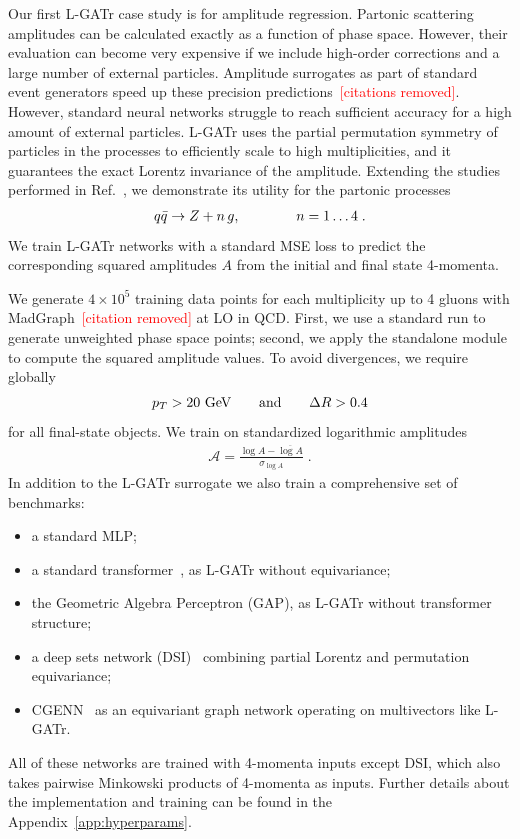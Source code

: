\documentclass[submission, Phys]{SciPost}
\begin{document}
Our first L-GATr case study is for amplitude regression.
%
Partonic scattering amplitudes can be calculated exactly as a function of phase space. However, their evaluation can become very expensive if we include high-order corrections and a large number of external particles. Amplitude surrogates as part of standard event generators speed up these precision predictions\textcolor{red}{~[citations removed]}. However, standard neural networks struggle to reach sufficient accuracy for a high amount of external particles. L-GATr uses the partial permutation symmetry of particles in the processes to efficiently scale to high multiplicities, and it guarantees the exact Lorentz invariance of the amplitude. Extending the studies performed in Ref.~\cite{Spinner:2024hjm}, we demonstrate its utility for the partonic processes
%
\begin{align}
 q \bar{q} \to Z + n  \, g, 
 \qquad\qquad n=1 \ldots 4 \; .
\end{align}
%
We train L-GATr networks with a standard MSE loss to predict the corresponding squared amplitudes $A$ from the initial and final state 4-momenta. 

We generate $4 \times 10^5$ training data points for each multiplicity up to 4 gluons with MadGraph\textcolor{red}{~[citation removed]} at LO in QCD. First, we use a standard run to generate unweighted phase space points; second, we apply the standalone module to compute the squared amplitude values. To avoid divergences, we require globally
%
\begin{align}
 p_T > 20~\text{GeV}
 \qquad \text{and}\qquad
 \Delta R > 0.4 
\end{align}
%
for all final-state objects. We train on standardized logarithmic amplitudes 
%
\begin{align}
\mathcal{A} = \frac{\log A - \overline{\log A}}{\sigma_{\log A}} \; .
\label{eq:amp_pre}
\end{align}
%
In addition to the L-GATr surrogate we also train a comprehensive set of benchmarks:
%
\begin{itemize}
\item a standard MLP; 
\item a standard transformer~\cite{vaswani2017attention}, as L-GATr without equivariance;
\item the Geometric Algebra Perceptron (GAP), as L-GATr without transformer structure;
\item a deep sets network (DSI)~\cite{zaheer2017deep} combining partial Lorentz and permutation equivariance;
\item CGENN~\cite{ruhe2023clifford} as an equivariant graph network operating on multivectors like L-GATr.
\end{itemize}
%
All of these networks are trained with 4-momenta inputs except DSI, which also takes pairwise Minkowski products of 4-momenta as inputs. Further details about the implementation and training can be found in the Appendix~\ref{app:hyperparams}.
\end{document}
